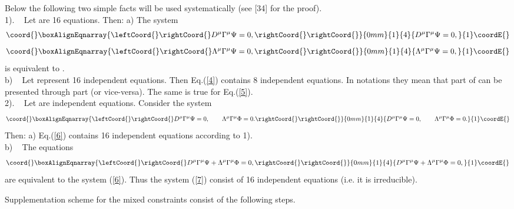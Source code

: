 \documentclass[a4paper]{article}
\begin{document}
Below the following two simple facts will be used 
systematically (see [34] for the proof). \\
1). ~ Let \coordHE{} are 16 equations. Then: a) The system 
\begin{eqnarray}\coord{}\boxAlignEqnarray{\leftCoord{}\rightCoord{}\label{4}
D^\mu\Gamma^\mu\Psi=0, \rightCoord{}
\rightCoord{}}{0mm}{1}{4}{D^\mu\Gamma^\mu\Psi=0, 
}{1}\coordE{}\end{eqnarray}
\begin{eqnarray}\coord{}\boxAlignEqnarray{\leftCoord{}\rightCoord{}\label{5}
\Lambda^\mu\Gamma^\mu\Psi=0, \rightCoord{}
\rightCoord{}}{0mm}{1}{4}{\Lambda^\mu\Gamma^\mu\Psi=0, 
}{1}\coordE{}\end{eqnarray}
is equivalent to \coordHE{}. \\
b) ~ Let \coordHE{} represent 16 independent equations. Then 
Eq.(\ref{4}) contains 8 independent equations. In \coordHE{} notations 
they mean that \coordHE{} part \coordHE{} of \myHighlight{$\Psi^\alpha$}\coordHE{} can be 
presented through \coordHE{} part \coordHE{} (or vice-versa). The same is 
true for Eq.(\ref{5}). \\
2). ~ Let \coordHE{} are \coordHE{} independent 
equations. Consider the system 
\begin{eqnarray}\coord{}\boxAlignEqnarray{\leftCoord{}\rightCoord{}\label{6}
D^\mu\Gamma^\mu\Psi=0, \qquad
\Lambda^\mu\Gamma^\mu\Phi=0. \rightCoord{}
\rightCoord{}}{0mm}{1}{4}{D^\mu\Gamma^\mu\Psi=0, \qquad
\Lambda^\mu\Gamma^\mu\Phi=0. 
}{1}\coordE{}\end{eqnarray}
Then: a) Eq.(\ref{6}) contains 16 independent equations according 
to 1). \\
b) ~ The equations 
\begin{eqnarray}\coord{}\boxAlignEqnarray{\leftCoord{}\rightCoord{}\label{7}
D^\mu\Gamma^\mu\Psi+\Lambda^\mu\Gamma^\mu\Phi=0, \rightCoord{}
\rightCoord{}}{0mm}{1}{4}{D^\mu\Gamma^\mu\Psi+\Lambda^\mu\Gamma^\mu\Phi=0, 
}{1}\coordE{}\end{eqnarray}
are equivalent to the system (\ref{6}). Thus the system (\ref{7}) 
consist of 16 independent equations (i.e. it is irreducible). 

Supplementation scheme
for the mixed constraints consist of the following steps.
\end{document}
